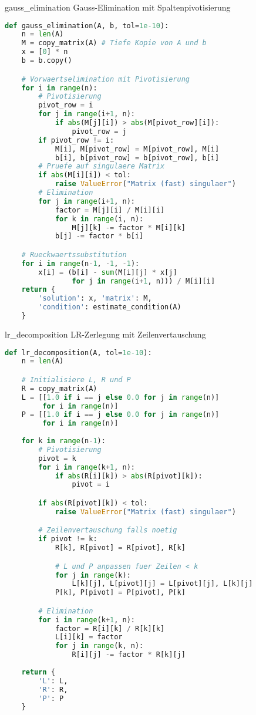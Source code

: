 \begin{examplecode}{gauss\_elimination} Gauss-Elimination mit Spaltenpivotisierung
\begin{lstlisting}[language=Python, style=basesmol]
def gauss_elimination(A, b, tol=1e-10):
    n = len(A)
    M = copy_matrix(A) # Tiefe Kopie von A und b
    x = [0] * n
    b = b.copy()

    # Vorwaertselimination mit Pivotisierung
    for i in range(n):
        # Pivotisierung
        pivot_row = i
        for j in range(i+1, n):
            if abs(M[j][i]) > abs(M[pivot_row][i]):
                pivot_row = j
        if pivot_row != i:
            M[i], M[pivot_row] = M[pivot_row], M[i]
            b[i], b[pivot_row] = b[pivot_row], b[i]
        # Pruefe auf singulaere Matrix
        if abs(M[i][i]) < tol:
            raise ValueError("Matrix (fast) singulaer")
        # Elimination
        for j in range(i+1, n):
            factor = M[j][i] / M[i][i]
            for k in range(i, n):
                M[j][k] -= factor * M[i][k]
            b[j] -= factor * b[i]

    # Rueckwaertssubstitution
    for i in range(n-1, -1, -1):
        x[i] = (b[i] - sum(M[i][j] * x[j] 
                for j in range(i+1, n))) / M[i][i]
    return {
        'solution': x, 'matrix': M,
        'condition': estimate_condition(A)
    }
\end{lstlisting}
\end{examplecode}


\begin{examplecode}{lr\_decomposition} LR-Zerlegung mit Zeilenvertauschung
\begin{lstlisting}[language=Python, style=basesmol]
def lr_decomposition(A, tol=1e-10):
    n = len(A)

    # Initialisiere L, R und P
    R = copy_matrix(A)
    L = [[1.0 if i == j else 0.0 for j in range(n)] 
         for i in range(n)]
    P = [[1.0 if i == j else 0.0 for j in range(n)] 
         for i in range(n)]
    
    for k in range(n-1):
        # Pivotisierung
        pivot = k
        for i in range(k+1, n):
            if abs(R[i][k]) > abs(R[pivot][k]):
                pivot = i

        if abs(R[pivot][k]) < tol:
            raise ValueError("Matrix (fast) singulaer")

        # Zeilenvertauschung falls noetig
        if pivot != k:
            R[k], R[pivot] = R[pivot], R[k]

            # L und P anpassen fuer Zeilen < k
            for j in range(k):
                L[k][j], L[pivot][j] = L[pivot][j], L[k][j]
            P[k], P[pivot] = P[pivot], P[k]

        # Elimination
        for i in range(k+1, n):
            factor = R[i][k] / R[k][k]
            L[i][k] = factor
            for j in range(k, n):
                R[i][j] -= factor * R[k][j]
    
    return {
        'L': L,
        'R': R,
        'P': P
    }
\end{lstlisting}
\end{examplecode}

